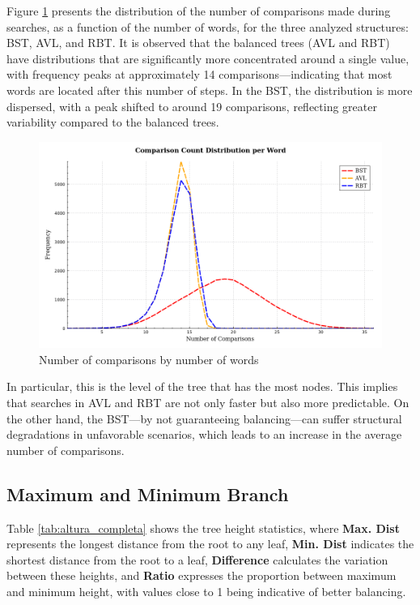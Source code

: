 Figure \ref{fig:comparacoes} presents the distribution of the number of comparisons made
during searches, as a function of the number of words, for the three analyzed structures:
BST, AVL, and RBT. It is observed that the balanced trees (AVL and RBT) have distributions
that are significantly more concentrated around a single value, with frequency peaks at
approximately 14 comparisons—indicating that most words are located after this
number of steps. In the BST, the distribution is more dispersed, with a peak
shifted to around 19 comparisons, reflecting greater variability compared to the balanced trees.

\begin{figure}[H]
    \centering
    \includegraphics[width=0.8\linewidth]{img/Graph_6_10103.pdf}
    \caption{Number of comparisons by number of words}
    \label{fig:comparacoes}
\end{figure}


In particular, this is the level of the tree that has the most nodes. This implies that searches in AVL and RBT are not only faster but also more predictable.
On the other hand, the BST—by not guaranteeing balancing—can suffer structural degradations in unfavorable scenarios, which leads to an increase in the average number of comparisons.

\subsection{Maximum and Minimum Branch}

Table \ref{tab:altura_completa} shows the tree height statistics,
where \textbf{Max. Dist} represents the longest distance from the root to any leaf,
\textbf{Min. Dist} indicates the shortest distance from the root to a leaf, \textbf{Difference}
calculates the variation between these heights, and \textbf{Ratio} expresses the proportion between maximum
and minimum height, with values close to 1 being indicative of better balancing.

